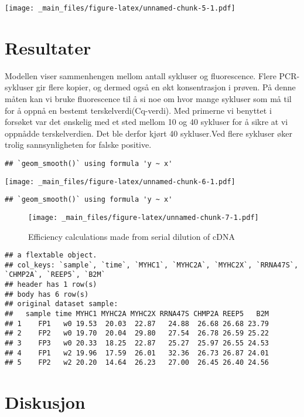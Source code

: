 \documentclass[
]{book}
\begin{document}
\texttt{[image: \_main\_files/figure-latex/unnamed-chunk-5-1.pdf]}

\hypertarget{resultater-1}{%
\section{Resultater}\label{resultater-1}}

Modellen viser sammenhengen mellom antall sykluser og fluorescence. Flere PCR-sykluser gir flere kopier, og dermed også en økt konsentrasjon i prøven. På denne måten kan vi bruke fluorescence til å si noe om hvor mange sykluser som må til for å oppnå en bestemt terskelverdi(Cq-verdi). Med primerne vi benyttet i forsøket var det ønskelig med et sted mellom 10 og 40 sykluser for å sikre at vi oppnådde terskelverdien. Det ble derfor kjørt 40 sykluser.Ved flere sykluser øker trolig sannsynligheten for falske positive.

\begin{verbatim}
## `geom_smooth()` using formula 'y ~ x'
\end{verbatim}

\texttt{[image: \_main\_files/figure-latex/unnamed-chunk-6-1.pdf]}

\begin{verbatim}
## `geom_smooth()` using formula 'y ~ x'
\end{verbatim}

\begin{figure}
\centering
\texttt{[image: \_main\_files/figure-latex/unnamed-chunk-7-1.pdf]}
\caption{\label{fig:unnamed-chunk-7}Efficiency calculations made from serial dilution of cDNA}
\end{figure}

\begin{verbatim}
## a flextable object.
## col_keys: `sample`, `time`, `MYHC1`, `MYHC2A`, `MYHC2X`, `RRNA47S`, `CHMP2A`, `REEP5`, `B2M` 
## header has 1 row(s) 
## body has 6 row(s) 
## original dataset sample: 
##   sample time MYHC1 MYHC2A MYHC2X RRNA47S CHMP2A REEP5   B2M
## 1    FP1   w0 19.53  20.03  22.87   24.88  26.68 26.68 23.79
## 2    FP2   w0 19.70  20.04  29.80   27.54  26.78 26.59 25.22
## 3    FP3   w0 20.33  18.25  22.87   25.27  25.97 26.55 24.53
## 4    FP1   w2 19.96  17.59  26.01   32.36  26.73 26.87 24.01
## 5    FP2   w2 20.20  14.64  26.23   27.00  26.45 26.40 24.56
\end{verbatim}

\hypertarget{diskusjon-1}{%
\section{Diskusjon}\label{diskusjon-1}}
\end{document}
